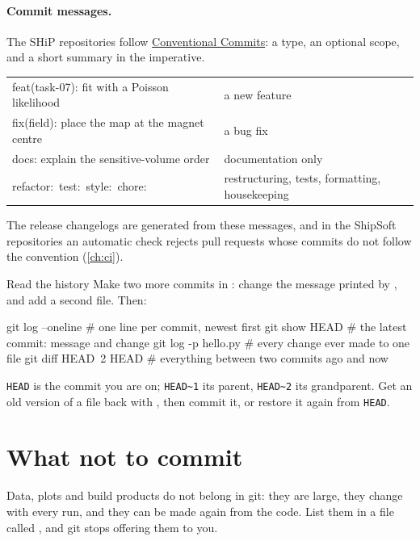 \paragraph{Commit messages.} The SHiP repositories follow
\href{https://www.conventionalcommits.org}{Conventional Commits}: a type, an
optional scope, and a short summary in the imperative.
\begin{center}\small
\begin{tabularx}{\linewidth}{>{\ttfamily}l L}
\toprule
feat(task-07): fit with a Poisson likelihood & a new feature \\
fix(field): place the map at the magnet centre & a bug fix \\
docs: explain the sensitive-volume order & documentation only \\
refactor:\ test:\ style:\ chore: & restructuring, tests, formatting, housekeeping \\
\bottomrule
\end{tabularx}
\end{center}
The release changelogs are generated from these messages, and in the ShipSoft
repositories an automatic check rejects pull requests whose commits do not
follow the convention (\cref{ch:ci}).

\begin{exercise}{Read the history}
Make two more commits in : change the message printed by
, and add a second file. Then:
\begin{shell}
git log --oneline              # one line per commit, newest first
git show HEAD                  # the latest commit: message and change
git log -p hello.py            # every change ever made to one file
git diff HEAD~2 HEAD           # everything between two commits ago and now
\end{shell}
\texttt{HEAD} is the commit you are on; \texttt{HEAD\textasciitilde1} its
parent, \texttt{HEAD\textasciitilde2} its grandparent. Get an old version of a
file back with ,
then commit it, or restore it again from \texttt{HEAD}.
\end{exercise}

\section{What not to commit}

Data, plots and build products do not belong in git: they are large, they
change with every run, and they can be made again from the code. List them
in a file called , and git stops offering them to you.


